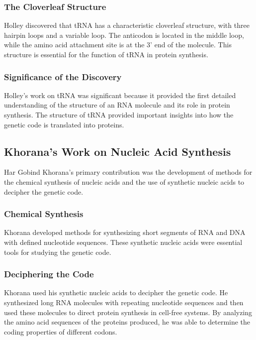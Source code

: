\subsubsection{The Cloverleaf Structure}

Holley discovered that tRNA has a characteristic cloverleaf structure, with three hairpin loops and a variable loop. The anticodon is located in the middle loop, while the amino acid attachment site is at the 3' end of the molecule. This structure is essential for the function of tRNA in protein synthesis.

\subsubsection{Significance of the Discovery}

Holley's work on tRNA was significant because it provided the first detailed understanding of the structure of an RNA molecule and its role in protein synthesis. The structure of tRNA provided important insights into how the genetic code is translated into proteins.

\subsection{Khorana's Work on Nucleic Acid Synthesis}

Har Gobind Khorana's primary contribution was the development of methods for the chemical synthesis of nucleic acids and the use of synthetic nucleic acids to decipher the genetic code.

\subsubsection{Chemical Synthesis}

Khorana developed methods for synthesizing short segments of RNA and DNA with defined nucleotide sequences. These synthetic nucleic acids were essential tools for studying the genetic code.

\subsubsection{Deciphering the Code}

Khorana used his synthetic nucleic acids to decipher the genetic code. He synthesized long RNA molecules with repeating nucleotide sequences and then used these molecules to direct protein synthesis in cell-free systems. By analyzing the amino acid sequences of the proteins produced, he was able to determine the coding properties of different codons.

